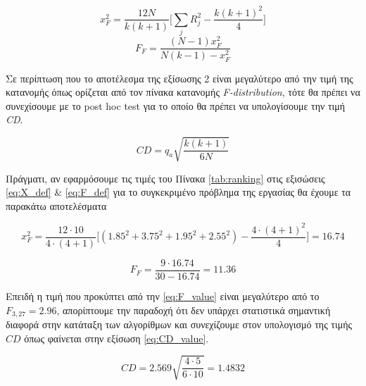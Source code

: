 \begin{equation}
\label{eq:X_def}
	x_F^2 = \frac{12N}{k(k+1)}\Big[ \sum_{j}R_j^2 - \frac{k(k+1)^2}{4} \Big]  
\end{equation}
\begin{equation}
\label{eq:F_def}
	F_F = \frac{(N −1)x_F^2}{N(k-1)-x_F^2}
\end{equation}

Σε περίπτωση που το αποτέλεσμα της εξίσωσης 2 είναι μεγαλύτερο από την τιμή της κατανομής όπως ορίζεται 
από τον πίνακα κατανομής \emph{F-distribution}, τότε θα πρέπει να συνεχίσουμε με το post hoc test
 για το οποίο θα πρέπει να υπολογίσουμε την τιμή \emph{CD}.

\begin{equation}
\label{eq:CD_def}
	CD = q_a\sqrt{\frac{k(k+1)}{6N}}
\end{equation}


Πράγματι, αν εφαρμόσουμε τις τιμές του Πίνακα \ref{tab:ranking} στις εξισώσεις 
\ref{eq:X_def} \& \ref{eq:F_def} για το συγκεκριμένο πρόβλημα της εργασίας θα έχουμε τα παρακάτω αποτελέσματα

\begin{equation}
\label{eq:X_value}
x_F^2 = \frac{12\cdot 10}{4\cdot(4+1)}\Big[ (1.85^2+3.75^2+1.95^2+2.55^2) - \frac{4\cdot(4+1)^2}{4} \Big]  = 16.74
\end{equation}

\begin{equation}
\label{eq:F_value}
F_F = \frac{9 \cdot 16.74}{30 - 16.74} = 11.36
\end{equation}

Επειδή η τιμή που προκύπτει από την \ref{eq:F_value} είναι μεγαλύτερο από το \emph{$F_{3,27} = 2.96$}, απορίπτουμε την παραδοχή ότι δεν υπάρχει στατιστικά σημαντική διαφορά στην κατάταξη των αλγορίθμων και συνεχίζουμε στον υπολογισμό της τιμής $CD$ όπως φαίνεται στην εξίσωση \ref{eq:CD_value}.

\begin{equation}
\label{eq:CD_value}
CD = 2.569\sqrt{\frac{4\cdot 5}{6 \cdot 10}} = 1.4832
\end{equation}

